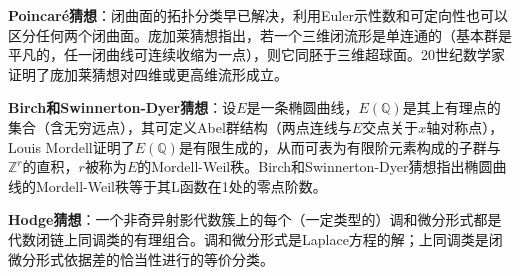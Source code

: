 \par \textbf{Poincaré猜想}：闭曲面的拓扑分类早已解决，利用Euler示性数和可定向性也可以区分任何两个闭曲面。庞加莱猜想指出，若一个三维闭流形是单连通的（基本群是平凡的，任一闭曲线可连续收缩为一点），则它同胚于三维超球面。20世纪数学家证明了庞加莱猜想对四维或更高维流形成立。

\par \textbf{Birch和Swinnerton-Dyer猜想}：设$E$是一条椭圆曲线，$E(\mathbb{Q})$是其上有理点的集合（含无穷远点），其可定义Abel群结构（两点连线与$E$交点关于$x$轴对称点），Louis Mordell证明了$E(\mathbb{Q})$是有限生成的，从而可表为有限阶元素构成的子群与$\mathbb{Z}^r$的直积，$r$被称为$E$的Mordell-Weil秩。Birch和Swinnerton-Dyer猜想指出椭圆曲线的Mordell-Weil秩等于其L函数在1处的零点阶数。

\par \textbf{Hodge猜想}：一个非奇异射影代数簇上的每个（一定类型的）调和微分形式都是代数闭链上同调类的有理组合。调和微分形式是Laplace方程的解；上同调类是闭微分形式依据差的恰当性进行的等价分类。

